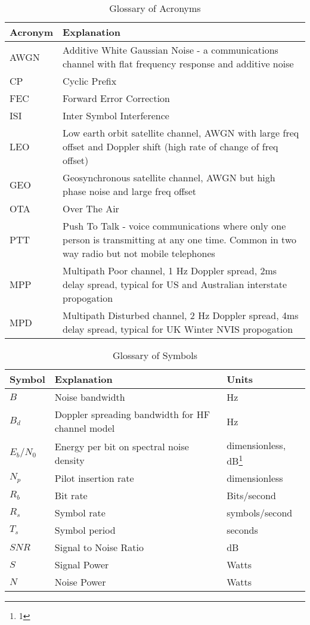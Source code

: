\documentclass{article}
\begin{document}
\begin{table}[h]
\centering
\begin{tabular}{l p{8cm} }
 \hline
 Acronym & Explanation \\
 \hline
 AWGN & Additive White Gaussian Noise - a communications channel with flat frequency response and additive noise \\
 CP & Cyclic Prefix \\
 FEC & Forward Error Correction \\
 ISI & Inter Symbol Interference \\
 LEO & Low earth orbit satellite channel, AWGN with large freq offset and Doppler shift (high rate of change of freq offset) \\
 GEO & Geosynchronous satellite channel, AWGN but high phase noise and large freq offset \\
 OTA & Over The Air \\
 PTT & Push To Talk - voice communications where only one person is transmitting at any one time.  Common in two way radio but not mobile telephones  \\
 MPP & Multipath Poor channel, 1 Hz Doppler spread, 2ms delay spread, typical for US and Australian interstate propogation \\
 MPD & Multipath Disturbed channel, 2 Hz Doppler spread, 4ms delay spread, typical for UK Winter NVIS propogation \\
 \hline
\end{tabular}
\caption{Glossary of Acronyms}
\end{table}

\begin{table}[h]
\centering
\begin{tabular}{l l l}
 \hline
 Symbol & Explanation & Units \\
 \hline
 $B$ & Noise bandwidth & Hz \\
 $B_d$ & Doppler spreading bandwidth for HF channel model & Hz \\
 $E_b/N_0$ & Energy per bit on spectral noise density & dimensionless, dB\footnote{1} \\
 $N_p$ & Pilot insertion rate & dimensionless \\
 $R_b$ & Bit rate & Bits/second \\
 $R_s$ & Symbol rate & symbols/second \\
 $T_s$ & Symbol period & seconds \\
 $SNR$ & Signal to Noise Ratio & dB \\
 $S$ & Signal Power & Watts \\
 $N$ & Noise Power & Watts \\
 \hline
\end{tabular}
\caption{Glossary of Symbols}
\end{table}
\end{document}
